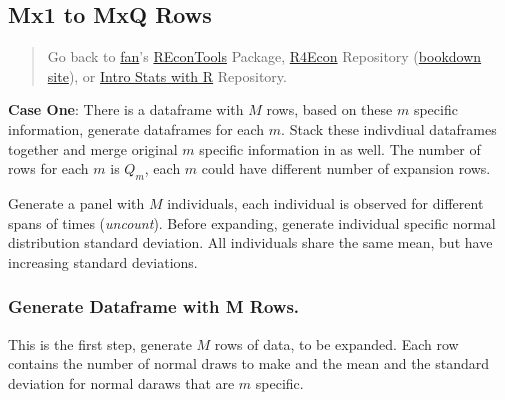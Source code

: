 \documentclass[
]{book}
\begin{document}
\hypertarget{mx1-to-mxq-rows}{%
\subsection{Mx1 to MxQ Rows}\label{mx1-to-mxq-rows}}

\begin{quote}
Go back to \href{http://fanwangecon.github.io/CodeDynaAsset/}{fan}'s \href{https://fanwangecon.github.io/REconTools/}{REconTools} Package, \href{https://fanwangecon.github.io/R4Econ/}{R4Econ} Repository (\href{https://fanwangecon.github.io/R4Econ/bookdown}{bookdown site}), or \href{https://fanwangecon.github.io/Stat4Econ/}{Intro Stats with R} Repository.
\end{quote}

\textbf{Case One}: There is a dataframe with \(M\) rows, based on these \(m\) specific information, generate dataframes for each \(m\). Stack these indivdiual dataframes together and merge original \(m\) specific information in as well. The number of rows for each \(m\) is \(Q_m\), each \(m\) could have different number of expansion rows.

Generate a panel with \(M\) individuals, each individual is observed for different spans of times (\emph{uncount}). Before expanding, generate individual specific normal distribution standard deviation. All individuals share the same mean, but have increasing standard deviations.

\hypertarget{generate-dataframe-with-m-rows.}{%
\subsubsection{Generate Dataframe with M Rows.}\label{generate-dataframe-with-m-rows.}}

This is the first step, generate \(M\) rows of data, to be expanded. Each row contains the number of normal draws to make and the mean and the standard deviation for normal daraws that are \(m\) specific.
\end{document}
